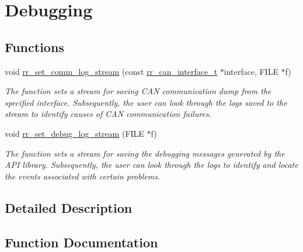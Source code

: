 \hypertarget{group___dbg}{}\section{Debugging}
\label{group___dbg}
\subsection*{Functions}
\begin{DoxyCompactItemize}
\item 
void \hyperlink{group___dbg_gaea43ac88d4b935bb3850a69a17462d31}{rr\+\_\+set\+\_\+comm\+\_\+log\+\_\+stream} (const \hyperlink{structrr__can__interface__t}{rr\+\_\+can\+\_\+interface\+\_\+t} $\ast$interface, F\+I\+LE $\ast$f)
\begin{DoxyCompactList}\small\item\em The function sets a stream for saving C\+AN communication dump from the specified interface. Subsequently, the user can look through the logs saved to the stream to identify causes of C\+AN communication failures. \end{DoxyCompactList}\item 
void \hyperlink{group___dbg_ga74cb6dc4d15701eaf5c6fd84b1325fc9}{rr\+\_\+set\+\_\+debug\+\_\+log\+\_\+stream} (F\+I\+LE $\ast$f)
\begin{DoxyCompactList}\small\item\em The function sets a stream for saving the debugging messages generated by the A\+PI library. Subsequently, the user can look through the logs to identify and locate the events associated with certain problems. \end{DoxyCompactList}\end{DoxyCompactItemize}


\subsection{Detailed Description}


\subsection{Function Documentation}
\mbox{\label{group___dbg_gaea43ac88d4b935bb3850a69a17462d31}} 
